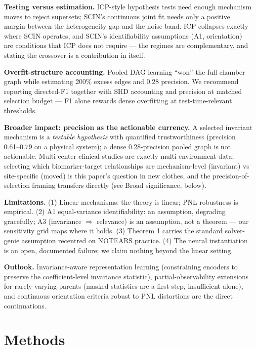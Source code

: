 \documentclass[11pt]{article}
\begin{document}
\textbf{Testing versus estimation.} ICP-style hypothesis tests need enough
mechanism moves to reject supersets; SCIN's continuous joint fit needs
only a positive margin between the heterogeneity gap and the noise
band. ICP collapses exactly where SCIN operates, and SCIN's
identifiability assumptions (A1, orientation) are conditions that ICP
does not require --- the regimes are complementary, and stating the
crossover is a contribution in itself.

\textbf{Overfit-structure accounting.} Pooled DAG learning ``won'' the full
chamber graph while estimating 200\% excess edges and 0.28 precision.
We recommend reporting directed-F1 together with SHD accounting and
precision at matched selection budget --- F1 alone rewards dense
overfitting at test-time-relevant thresholds.

\textbf{Broader impact: precision as the actionable currency.} A selected
invariant mechanism is a \emph{testable hypothesis} with quantified
trustworthiness (precision 0.61--0.79 on a physical system); a dense
0.28-precision pooled graph is not actionable. Multi-center clinical
studies are exactly multi-environment data; selecting which
biomarker-target relationships are mechanism-level (invariant) vs
site-specific (moved) is this paper's question in new clothes, and the
precision-of-selection framing transfers directly (see Broad
significance, below).

\textbf{Limitations.} (1) Linear mechanisms: the theory is linear; PNL
robustness is empirical. (2) A1 equal-variance identifiability:
an assumption, degrading gracefully; A3 (invariance \(\Rightarrow\) relevance) is
an assumption, not a theorem --- our sensitivity grid maps where it
holds. (3) Theorem 1 carries the standard solver-genie assumption
recentred on NOTEARS practice. (4) The neural instantiation is an
open, documented failure; we claim nothing beyond the linear setting.

\textbf{Outlook.} Invariance-aware representation learning (constraining
encoders to preserve the coefficient-level invariance statistic),
partial-observability extensions for rarely-varying parents (masked
statistics are a first step, insufficient alone), and continuous
orientation criteria robust to PNL distortions are the direct
continuations.

\section{Methods }
\end{document}
